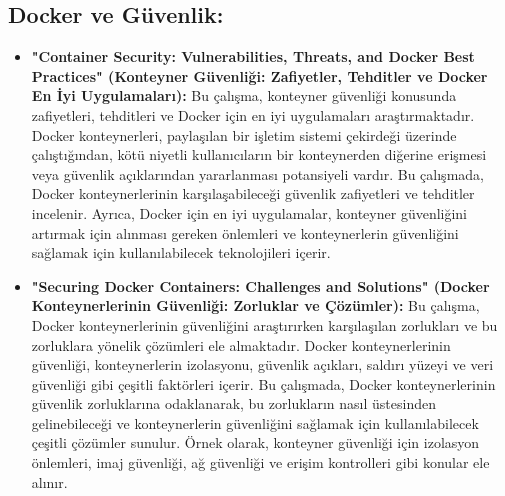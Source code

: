 \subsection{Docker ve Güvenlik:}
\begin{itemize}
\item \textbf{ "Container Security: Vulnerabilities, Threats, and Docker Best Practices" (Konteyner Güvenliği: Zafiyetler, Tehditler ve Docker En İyi Uygulamaları):}
Bu çalışma, konteyner güvenliği konusunda zafiyetleri, tehditleri ve Docker için en iyi uygulamaları araştırmaktadır. Docker konteynerleri, paylaşılan bir işletim sistemi çekirdeği üzerinde çalıştığından, kötü niyetli kullanıcıların bir konteynerden diğerine erişmesi veya güvenlik açıklarından yararlanması potansiyeli vardır. Bu çalışmada, Docker konteynerlerinin karşılaşabileceği güvenlik zafiyetleri ve tehditler incelenir. Ayrıca, Docker için en iyi uygulamalar, konteyner güvenliğini artırmak için alınması gereken önlemleri ve konteynerlerin güvenliğini sağlamak için kullanılabilecek teknolojileri içerir.\\
\item \textbf{"Securing Docker Containers: Challenges and Solutions" (Docker Konteynerlerinin Güvenliği: Zorluklar ve Çözümler):}
 Bu çalışma, Docker konteynerlerinin güvenliğini araştırırken karşılaşılan zorlukları ve bu zorluklara yönelik çözümleri ele almaktadır. Docker konteynerlerinin güvenliği, konteynerlerin izolasyonu, güvenlik açıkları, saldırı yüzeyi ve veri güvenliği gibi çeşitli faktörleri içerir. Bu çalışmada, Docker konteynerlerinin güvenlik zorluklarına odaklanarak, bu zorlukların nasıl üstesinden gelinebileceği ve konteynerlerin güvenliğini sağlamak için kullanılabilecek çeşitli çözümler sunulur. Örnek olarak, konteyner güvenliği için izolasyon önlemleri, imaj güvenliği, ağ güvenliği ve erişim kontrolleri gibi konular ele alınır.
\end{itemize}
   